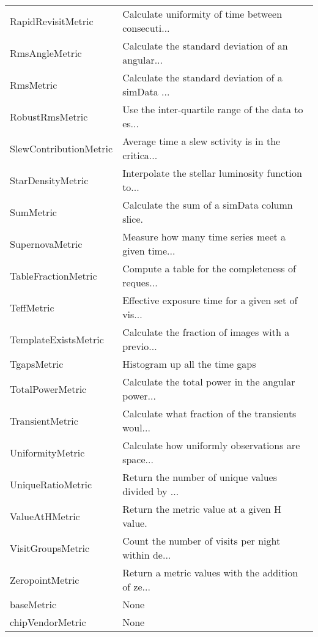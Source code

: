 \begin{tabular}{ll}
            RapidRevisitMetric &  Calculate uniformity of time between consecuti... \\
                RmsAngleMetric &  Calculate the standard deviation of an angular... \\
                     RmsMetric &  Calculate the standard deviation of a simData ... \\
               RobustRmsMetric &  Use the inter-quartile range of the data to es... \\
        SlewContributionMetric &  Average time a slew sctivity is in the critica... \\
             StarDensityMetric &  Interpolate the stellar luminosity function to... \\
                     SumMetric &       Calculate the sum of a simData column slice. \\
               SupernovaMetric &  Measure how many time series meet a given time... \\
           TableFractionMetric &  Compute a table for the completeness of reques... \\
                    TeffMetric &  Effective exposure time for a given set of vis... \\
          TemplateExistsMetric &  Calculate the fraction of images with a previo... \\
                   TgapsMetric &                    Histogram up all the time gaps  \\
              TotalPowerMetric &  Calculate the total power in the angular power... \\
               TransientMetric &  Calculate what fraction of the transients woul... \\
              UniformityMetric &  Calculate how uniformly observations are space... \\
             UniqueRatioMetric &  Return the number of unique values divided by ... \\
                ValueAtHMetric &        Return the metric value at a given H value. \\
             VisitGroupsMetric &  Count the number of visits per night within de... \\
               ZeropointMetric &  Return a metric values with the addition of ze... \\
                    baseMetric &                                               None \\
              chipVendorMetric &                                               None \\

\end{tabular}
